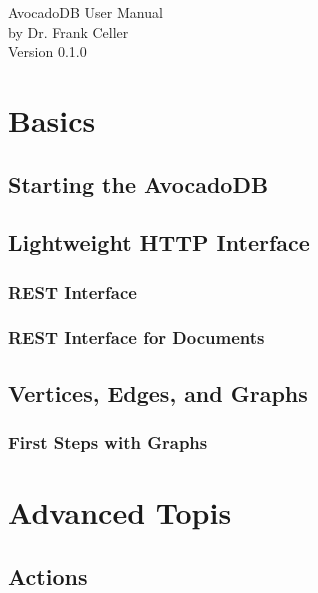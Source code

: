 \documentclass[a4paper]{book}
\begin{document}
\begin{titlepage}
\vspace*{7cm}
\begin{center}
{\Large AvocadoDB User Manual }\\
\vspace*{1cm}
{\large by Dr. Frank Celler}\\
\vspace*{0.5cm}
{\small Version 0.1.0}\\
\end{center}
\end{titlepage}
\clearemptydoublepage
{}
\tableofcontents
\clearemptydoublepage
{}
\chapter{Basics}
\label{Basics}

\section{Starting the AvocadoDB}
\label{StartStop}

\section{Lightweight HTTP Interface}
\label{HttpInterface}

\subsection{REST Interface}
\label{RestInterface}

\subsection{REST Interface for Documents}
\label{RestDocument}

\section{Vertices, Edges, and Graphs}
\subsection{First Steps with Graphs}
\label{Graphs}

\chapter{Advanced Topis}
\section{Actions}
\end{document}
